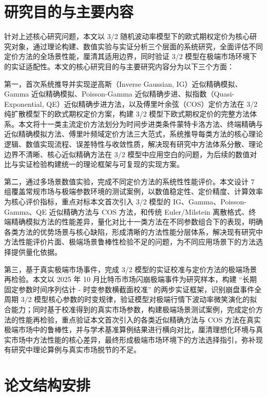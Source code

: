 \section{研究目的与主要内容}

针对上述核心研究问题，本文以 3/2 随机波动率模型下的欧式期权定价为核心研究对象，通过理论构建、数值实验与实证分析三个层面的系统研究，全面评估不同定价方法的全场景性能，厘清其适用边界，同时验证 3/2 模型在极端市场环境下的实证适配性。本文的核心研究目的与主要研究内容分为以下三个方面：

第一，首次系统推导并实现逆高斯（Inverse Gaussian, IG）近似精确模拟、Gamma 近似精确模拟、Poisson-Gamma 近似精确步进、拟指数（Quasi-Exponential, QE）近似精确步进方法，以及傅里叶余弦（COS）定价方法在 3/2 纯扩散模型下的欧式期权定价方案，构建 3/2 模型下欧式期权定价的完整方法体系。本文将十一类主流定价方法划分为时间步进类条件蒙特卡洛方法、终端精确与近似精确模拟方法、傅里叶频域定价方法三大范式，系统推导每类方法的核心理论逻辑、数值实现流程、误差特性与收敛性质，解决现有研究中方法体系分散、理论边界不清晰、核心近似精确方法在 3/2 模型中应用空白的问题，为后续的数值对比与实证检验构建统一的理论框架与可复现的实现方案。

第二，通过多场景数值实验，完成不同定价方法的系统性性能评价。本文设计 7 组覆盖常规市场与极端参数环境的测试案例，以数值稳定性、定价精度、计算效率为核心评价指标，重点对标本文首次引入 3/2 模型的 IG、Gamma、Poisson-Gamma、QE 近似精确方法与 COS 方法，和传统 Euler/Milstein 离散格式、终端精确模拟方法的性能差异，量化对比十一类方法在不同参数组合下的表现，明确各类方法的优势场景与核心缺陷，形成清晰的方法性能分层体系，解决现有研究中方法性能评价片面、极端场景鲁棒性检验不足的问题，为不同应用场景下的方法选择提供量化依据。

第三，基于真实极端市场事件，完成 3/2 模型的实证校准与定价方法的极端场景再检验。本文以 2025 年 10 月比特币市场闪崩极端事件为研究样本，构建 “长期固定参数时间序列估计 - 时变参数横截面校准” 的两步实证框架，识别崩盘事件全周期 3/2 模型核心参数的时变规律，验证模型对极端行情下波动率微笑演化的拟合能力；同时基于校准得到的真实市场参数，构建极端场景测试案例，完成定价方法的性能再检验，重点验证本文首次引入的各类近似精确方法与 COS 方法在真实极端市场中的鲁棒性，并与学术基准算例结果进行横向对比，厘清理想化环境与真实市场中方法性能的核心差异，最终形成极端市场环境下的方法选择指引，弥补现有研究中理论算例与真实市场脱节的不足。

\section{论文结构安排}

